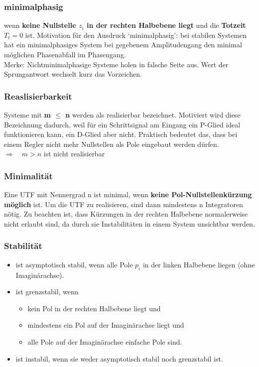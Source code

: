\subsubsection{minimalphasig }
wenn \textbf{keine Nullstelle $z_i$ in der rechten Halbebene liegt} und die \textbf{Totzeit $T_t = 0$} ist.
Motivation für den Ausdruck ‘minimalphasig’: bei stabilen Systemen hat ein
minimalphasiges System bei gegebenem Amplitudengang den minimal möglichen
Phasenabfall im Phasengang.\\
Merke: Nichtminimalphasige Systeme holen in falsche Seite aus. Wert der Sprungantwort wechselt kurz das Vorzeichen.

\subsubsection{Reaslisierbarkeit }
Systeme mit \textbf{m $\leq$ n} werden als realisierbar bezeichnet. Motiviert wird
diese Bezeichnung dadurch, weil für ein Schrittsignal am Eingang ein P-Glied ideal
funktionieren kann, ein D-Glied aber nicht. Praktisch bedeutet das, dass bei einem Regler nicht mehr Nullstellen als Pole
eingebaut werden dürfen. $\Rightarrow \quad m > n$ ist nicht realisierbar

\subsubsection{Minimalität }

Eine UTF mit Nennergrad n ist minimal, wenn \textbf{keine Pol-Nullstellenkürzung
möglich} ist. Um die UTF zu realisieren, sind dann mindestens n Integratoren nötig. Zu beachten ist, dass Kürzungen in
der rechten Halbebene normalerweise nicht erlaubt sind, da durch sie Instabilitäten
in einem System unsichtbar werden.

\subsubsection{Stabilität }
\begin{itemize}
\item  ist asymptotisch stabil, wenn
alle Pole $p_i$ in der linken Halbebene liegen (ohne Imaginärachse).
\item  ist grenzstabil, wenn
\begin{itemize}
\item kein Pol in der rechten Halbebene liegt und
\item mindestens ein Pol auf der Imaginärachse liegt und
\item alle Pole auf der Imaginärachse einfache Pole sind.
\end{itemize}
\item  ist instabil, wenn
sie weder asymptotisch stabil noch grenzstabil ist.
\end{itemize}

